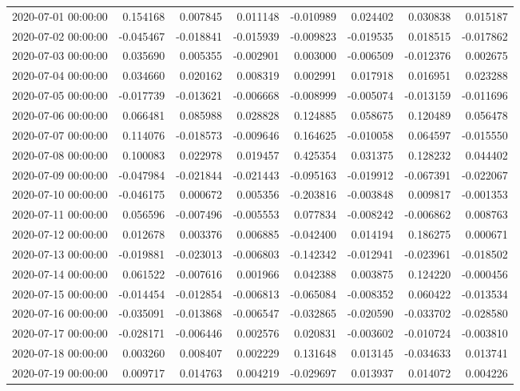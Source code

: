 \begin{tabular}{lrrrrrrr}
2020-07-01 00:00:00 & 0.154168 & 0.007845 & 0.011148 & -0.010989 & 0.024402 & 0.030838 & 0.015187 \\
2020-07-02 00:00:00 & -0.045467 & -0.018841 & -0.015939 & -0.009823 & -0.019535 & 0.018515 & -0.017862 \\
2020-07-03 00:00:00 & 0.035690 & 0.005355 & -0.002901 & 0.003000 & -0.006509 & -0.012376 & 0.002675 \\
2020-07-04 00:00:00 & 0.034660 & 0.020162 & 0.008319 & 0.002991 & 0.017918 & 0.016951 & 0.023288 \\
2020-07-05 00:00:00 & -0.017739 & -0.013621 & -0.006668 & -0.008999 & -0.005074 & -0.013159 & -0.011696 \\
2020-07-06 00:00:00 & 0.066481 & 0.085988 & 0.028828 & 0.124885 & 0.058675 & 0.120489 & 0.056478 \\
2020-07-07 00:00:00 & 0.114076 & -0.018573 & -0.009646 & 0.164625 & -0.010058 & 0.064597 & -0.015550 \\
2020-07-08 00:00:00 & 0.100083 & 0.022978 & 0.019457 & 0.425354 & 0.031375 & 0.128232 & 0.044402 \\
2020-07-09 00:00:00 & -0.047984 & -0.021844 & -0.021443 & -0.095163 & -0.019912 & -0.067391 & -0.022067 \\
2020-07-10 00:00:00 & -0.046175 & 0.000672 & 0.005356 & -0.203816 & -0.003848 & 0.009817 & -0.001353 \\
2020-07-11 00:00:00 & 0.056596 & -0.007496 & -0.005553 & 0.077834 & -0.008242 & -0.006862 & 0.008763 \\
2020-07-12 00:00:00 & 0.012678 & 0.003376 & 0.006885 & -0.042400 & 0.014194 & 0.186275 & 0.000671 \\
2020-07-13 00:00:00 & -0.019881 & -0.023013 & -0.006803 & -0.142342 & -0.012941 & -0.023961 & -0.018502 \\
2020-07-14 00:00:00 & 0.061522 & -0.007616 & 0.001966 & 0.042388 & 0.003875 & 0.124220 & -0.000456 \\
2020-07-15 00:00:00 & -0.014454 & -0.012854 & -0.006813 & -0.065084 & -0.008352 & 0.060422 & -0.013534 \\
2020-07-16 00:00:00 & -0.035091 & -0.013868 & -0.006547 & -0.032865 & -0.020590 & -0.033702 & -0.028580 \\
2020-07-17 00:00:00 & -0.028171 & -0.006446 & 0.002576 & 0.020831 & -0.003602 & -0.010724 & -0.003810 \\
2020-07-18 00:00:00 & 0.003260 & 0.008407 & 0.002229 & 0.131648 & 0.013145 & -0.034633 & 0.013741 \\
2020-07-19 00:00:00 & 0.009717 & 0.014763 & 0.004219 & -0.029697 & 0.013937 & 0.014072 & 0.004226 \\

\end{tabular}
